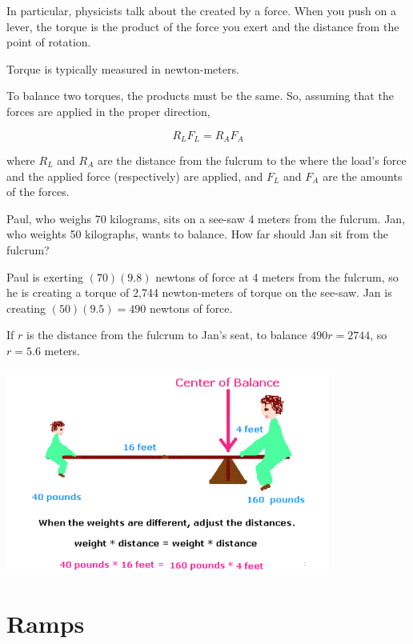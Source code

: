 In particular, physicists talk about the  created by a
force. When you push on a lever, the torque is the product of the
force you exert and the distance from the point of rotation.

Torque is typically measured in newton-meters.

To balance two torques, the products must be the same. So, assuming
that the forces are applied in the proper direction,

$$R_L F_L = R_A F_A$$

where $R_L$ and $R_A$ are the distance from the fulcrum to the where
the load's force and the applied force (respectively) are applied, and
$F_L$ and $F_A$ are the amounts of the forces.

\begin{Exercise}[title={Lever}, label=lever]
  
Paul, who weighs 70 kilograms, sits on a see-saw 4 meters from the
fulcrum.  Jan, who weights 50 kilographs, wants to balance. How far
should Jan sit from the fulcrum?

\end{Exercise}
\begin{Answer}[ref=lever]
  Paul is exerting $(70)(9.8)$ newtons of force at 4 meters from the
  fulcrum, so he is creating a torque of 2,744 newton-meters of torque
  on the see-saw.  Jan is creating $(50)(9.5) = 490$ newtons of
  force.

  If $r$ is the distance from the fulcrum to Jan's seat, to balance
  $490 r = 2744$, so $r = 5.6$ meters.
\end{Answer}

\includegraphics[width=0.8\textwidth]{WD=WD.png}

\section{Ramps}


